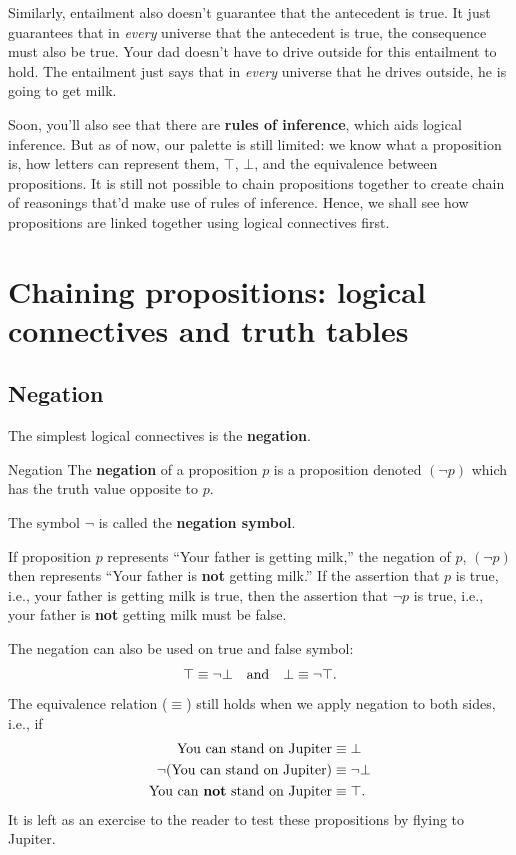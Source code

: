Similarly, entailment also doesn't guarantee that the antecedent is true. It just guarantees that in \emph{every} universe that the antecedent is true, the consequence must also be true. Your dad doesn't have to drive outside for this entailment to hold. The entailment just says that in \emph{every} universe that he drives outside, he is going to get milk.

Soon, you'll also see that there are \textbf{rules of inference}, which aids logical inference. But as of now, our palette is still limited: we know what a proposition is, how letters can represent them, \(\top\), \(\bot\), and the equivalence between propositions. It is still not possible to chain propositions together to create chain of reasonings that'd make use of rules of inference. Hence, we shall see how propositions are linked together using logical connectives first.

\section{Chaining propositions: logical connectives and truth tables}

\subsection{Negation}

The simplest logical connectives is the \textbf{negation}.

\begin{df}{Negation}{}
  The \textbf{negation} of a proposition \(p\) is a proposition denoted \((\neg p)\) which has the truth value opposite to \(p\).

  The symbol \(\neg\) is called the \textbf{negation symbol}.
\end{df}

If proposition \(p\) represents \enquote{Your father is getting milk,} the negation of \(p\), \((\neg p)\) then represents \enquote{Your father is \textbf{not} getting milk.} If the assertion that \(p\) is true, i.e., your father is getting milk is true, then the assertion that \(\neg p\) is true, i.e., your father is \textbf{not} getting milk must be false.

The negation can also be used on true and false symbol:
\begin{equation}
  \top \equiv \neg\bot \quad\textrm{and}\quad \bot \equiv \neg\top.
\end{equation}
The equivalence relation ($\equiv$) still holds when we apply negation to both sides, i.e., if
\begin{align*}
  \textrm{You can stand on Jupiter}              & \equiv \bot     \\
  \neg(\textrm{You can stand on Jupiter})        & \equiv \neg\bot \\
  \textrm{You can \textbf{not} stand on Jupiter} & \equiv \top.
\end{align*}
It is left as an exercise to the reader to test these propositions by flying to Jupiter.

